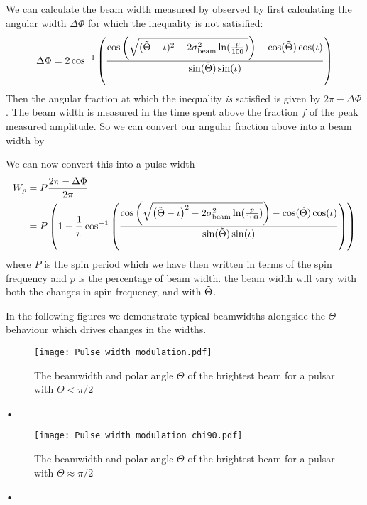 \documentclass[/home/greg/Thesis/main/main.tex]{subfiles}
\begin{document}
We can calculate the beam width measured by observed by first calculating the
angular width $\Delta\Phi$ for which the inequality is not satisified:
\begin{equation}
    \Delta\Phi = 2\cos^{-1}\left(
                \frac{\cos\left(\sqrt{
                    (\tilde{\Theta} - \iota)^{2}-2\sigma_{\textrm{beam}}^{2} \ln(\frac{p}{100})}\right)-\cos(\tilde{\Theta})\cos(\iota)}
                          {\sin(\tilde{\Theta})\sin(\iota)}
                      \right)
\end{equation}
Then the angular fraction at which the inequality \emph{is} satisfied is given by
$2\pi - \Delta\Phi$. The beam width is measured in the time spent above the 
fraction $f$ of the peak measured amplitude. So we can convert our angular 
fraction above into a beam width by

We can now convert this into a pulse width 
\begin{align}
    W_p & = P \frac{2\pi - \Delta\Phi}{2\pi} \\
          & = P\left(1 -
               \frac{1}{\pi}\cos^{-1}\left(
                   \frac{\cos\left(\sqrt{\left(\tilde{\Theta} - \iota\right)^{2}-2\sigma_{\textrm{beam}}^{2} \ln(\frac{p}{100})}\right)
                    - \cos(\tilde{\Theta})\cos(\iota)}
                          {\sin(\tilde{\Theta})\sin(\iota)}
                      \right)
                  \right)
\label{eqn: Wp}
\end{align}
where $P$ is the spin period which we have then written in terms of the spin
frequency and $p$ is the percentage of beam width. 
the beam width will vary with both the changes in spin-frequency, and with
$\tilde{\Theta}$.

In the following figures we demonstrate typical beamwidths alongside the 
$\Theta$ behaviour which drives changes in the widths.
\begin{figure}[ht]
\centering
\texttt{[image: Pulse\_width\_modulation.pdf]}
\caption{The beamwidth and polar angle $\Theta$ of the brightest beam for a pulsar
         with $\Theta < \pi/2$}
\label{fig: Pulse width modulation}
\end{figure}•

\begin{figure}[ht]
\centering
\texttt{[image: Pulse\_width\_modulation\_chi90.pdf]}
\caption{The beamwidth and polar angle $\Theta$ of the brightest beam for a pulsar
         with $\Theta \approx \pi/2$}
\label{fig: Pulse width modulation chi90}
\end{figure}•
\end{document}
